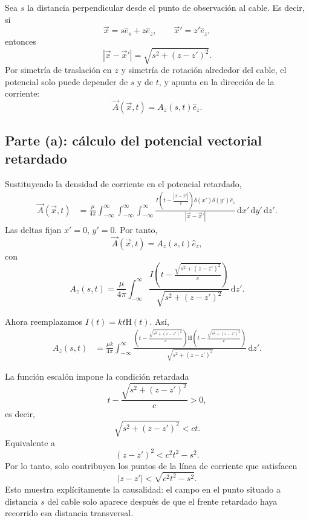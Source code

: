 \documentclass{article}
\numberwithin{equation}{section}
\newcommand{\dd}{\,\mathrm{d}}
\newcommand{\Hh}{\mathrm H}
\begin{document}
Sea $s$ la distancia perpendicular desde el punto de observación al cable. Es decir, si
\begin{equation*}
    \vec x=s\hat e_s+z\hat e_z,
    \qquad
    \vec x'=z'\hat e_z,
\end{equation*}
entonces
\begin{equation*}
    |\vec x-\vec x'|=\sqrt{s^2+(z-z')^2}.
\end{equation*}
Por simetría de traslación en $z$ y simetría de rotación alrededor del cable, el potencial solo puede depender de $s$ y de $t$, y apunta en la dirección de la corriente:
\begin{equation*}
    \vec A(\vec x,t)=A_z(s,t)\hat e_z.
\end{equation*}

\subsection{Parte (a): cálculo del potencial vectorial retardado}

Sustituyendo la densidad de corriente en el potencial retardado,
\begin{align*}
    \vec A(\vec x,t)
    &=\frac{\mu}{4\pi}\int_{-\infty}^{\infty}\int_{-\infty}^{\infty}\int_{-\infty}^{\infty}
    \frac{I\left(t-\frac{|\vec x-\vec x'|}{c}\right)\delta(x')\delta(y')\hat e_z}{|\vec x-\vec x'|}
    \dd x'\dd y'\dd z'.
\end{align*}
Las deltas fijan $x'=0$, $y'=0$. Por tanto,
\begin{equation*}
    \vec A(\vec x,t)=A_z(s,t)\hat e_z,
\end{equation*}
con
\begin{equation*}
    A_z(s,t)
    =\frac{\mu}{4\pi}\int_{-\infty}^{\infty}
    \frac{I\left(t-\frac{\sqrt{s^2+(z-z')^2}}{c}\right)}{\sqrt{s^2+(z-z')^2}}
    \dd z'.
\end{equation*}

Ahora reemplazamos $I(t)=kt\Hh(t)$. Así,
\begin{align*}
    A_z(s,t)
    &=\frac{\mu k}{4\pi}\int_{-\infty}^{\infty}
    \frac{\left(t-\frac{\sqrt{s^2+(z-z')^2}}{c}\right)
    \Hh\left(t-\frac{\sqrt{s^2+(z-z')^2}}{c}\right)}{\sqrt{s^2+(z-z')^2}}
    \dd z'.
\end{align*}

La función escalón impone la condición retardada
\begin{equation*}
    t-\frac{\sqrt{s^2+(z-z')^2}}{c}>0,
\end{equation*}
es decir,
\begin{equation*}
    \sqrt{s^2+(z-z')^2}<ct.
\end{equation*}
Equivalente a
\begin{equation*}
    (z-z')^2<c^2t^2-s^2.
\end{equation*}
Por lo tanto, solo contribuyen los puntos de la línea de corriente que satisfacen
\begin{equation*}
    |z-z'|<\sqrt{c^2t^2-s^2}.
\end{equation*}
Esto muestra explícitamente la causalidad: el campo en el punto situado a distancia $s$ del cable solo aparece después de que el frente retardado haya recorrido esa distancia transversal.
\end{document}
